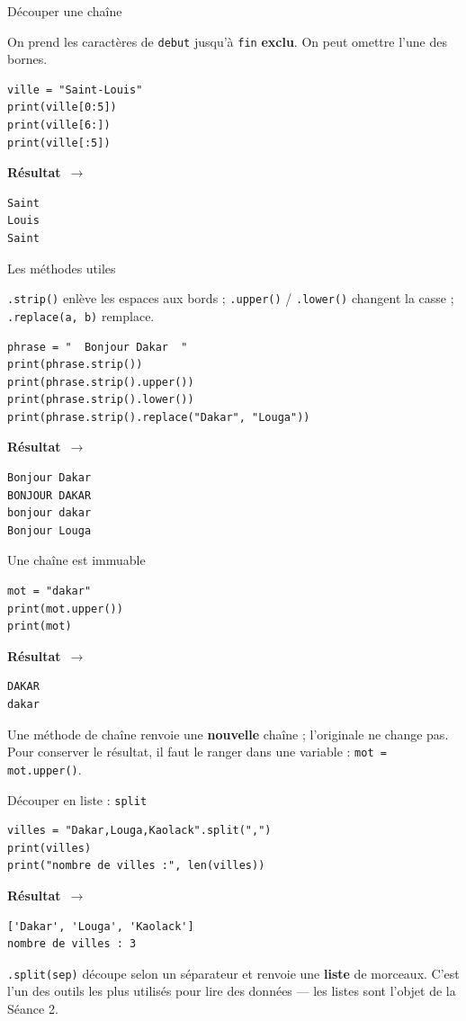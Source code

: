 \documentclass[aspectratio=169,11pt]{beamer}
\newcommand{\resultat}{{\scriptsize\textbf{R\'esultat}~$\rightarrow$}\par\vspace{1pt}}
\begin{document}
\begin{frame}[fragile]{Découper une chaîne}
\begin{ucadex}
{\small On prend les caractères de \texttt{debut} jusqu'à \texttt{fin} \textbf{exclu}. On peut omettre l'une des bornes.}
\end{ucadex}
\begin{lstlisting}
ville = "Saint-Louis"
print(ville[0:5])
print(ville[6:])
print(ville[:5])
\end{lstlisting}
\resultat
\begin{lstlisting}[style=out]
Saint
Louis
Saint
\end{lstlisting}
\end{frame}

\begin{frame}[fragile]{Les méthodes utiles}
\begin{ucadex}
{\small \texttt{.strip()} enlève les espaces aux bords ; \texttt{.upper()} / \texttt{.lower()} changent la casse ; \texttt{.replace(a, b)} remplace.}
\end{ucadex}
\begin{lstlisting}
phrase = "  Bonjour Dakar  "
print(phrase.strip())
print(phrase.strip().upper())
print(phrase.strip().lower())
print(phrase.strip().replace("Dakar", "Louga"))
\end{lstlisting}
\resultat
\begin{lstlisting}[style=out]
Bonjour Dakar
BONJOUR DAKAR
bonjour dakar
Bonjour Louga
\end{lstlisting}
\end{frame}

\begin{frame}[fragile]{Une chaîne est immuable}
\begin{lstlisting}
mot = "dakar"
print(mot.upper())
print(mot)
\end{lstlisting}
\resultat
\begin{lstlisting}[style=out]
DAKAR
dakar
\end{lstlisting}
{\small Une méthode de chaîne renvoie une \textbf{nouvelle} chaîne ; l'originale ne change pas. Pour conserver le résultat, il faut le ranger dans une variable : \texttt{mot = mot.upper()}.}
\end{frame}

\begin{frame}[fragile]{Découper en liste : \texttt{split}}
\begin{lstlisting}
villes = "Dakar,Louga,Kaolack".split(",")
print(villes)
print("nombre de villes :", len(villes))
\end{lstlisting}
\resultat
\begin{lstlisting}[style=out]
['Dakar', 'Louga', 'Kaolack']
nombre de villes : 3
\end{lstlisting}
{\small \texttt{.split(sep)} découpe selon un séparateur et renvoie une \textbf{liste} de morceaux. C'est l'un des outils les plus utilisés pour lire des données — les listes sont l'objet de la Séance 2.}
\end{frame}
\end{document}
